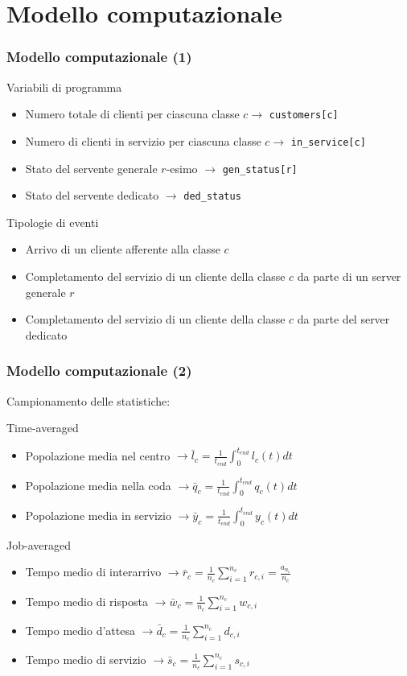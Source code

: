 \documentclass[
	usepdftitle=false,
	xcolor={table, dvipsnames},
	hyperref={
		pdftitle={Studio delle prestazioni di un Ufficio Postale ispirato a Poste Italiane},
    	pdfauthor={A. Chillotti, C. Cuffaro e S. Tiberi}
    }
]{beamer}
\begin{document}
\section{Modello computazionale}
\begin{frame}
\frametitle{Modello computazionale (1)}
\begin{block}{Variabili di programma}
\begin{itemize}
\item Numero totale di clienti per ciascuna classe $c \to$ \texttt{customers[c]}
\item Numero di clienti in servizio per ciascuna classe $c \to$ \texttt{in\_service[c]}
\item Stato del servente generale $r$-esimo $\to$ \texttt{gen\_status[r]}
\item Stato del servente dedicato $\to$ \texttt{ded\_status}
\end{itemize}
\end{block}
\begin{block}{Tipologie di eventi}
\begin{itemize}
\item Arrivo di un cliente afferente alla classe $c$
\item Completamento del servizio di un cliente della classe $c$ da parte di un server generale $r$
\item Completamento del servizio di un cliente della classe $c$ da parte del server dedicato
\end{itemize} 
\end{block}
\end{frame}

\begin{frame}
\frametitle{Modello computazionale (2)}
Campionamento delle statistiche:
\begin{block}{Time-averaged}
\begin{itemize}
\item Popolazione media nel centro $\to\bar{l}_c=\frac{1}{t_{end}}\int_0^{t_{end}} l_c(t) dt$
\item Popolazione media nella coda $\to\bar{q}_c=\frac{1}{t_{end}}\int_0^{t_{end}} q_c(t) dt$
\item Popolazione media in servizio $\to\bar{y}_c=\frac{1}{t_{end}}\int_0^{t_{end}} y_c(t) dt$
\end{itemize}
\end{block}
\begin{block}{Job-averaged}
\begin{itemize}
\item Tempo medio di interarrivo $\to\bar{r}_c = \frac{1}{n_c} \sum_{i=1}^{n_c} r_{c,i} = \frac{a_{n_c}}{n_c}$
\item Tempo medio di risposta $\to\bar{w}_c = \frac{1}{n_c} \sum_{i=1}^{n_c} w_{c,i}$
\item Tempo medio d'attesa $\to\bar{d}_c = \frac{1}{n_c} \sum_{i=1}^{n_c} d_{c,i}$
\item Tempo medio di servizio $\to\bar{s}_c = \frac{1}{n_c} \sum_{i=1}^{n_c} s_{c,i}$
\end{itemize}
\end{block}
\end{frame}
\end{document}
